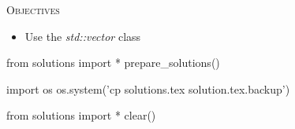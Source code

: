 
\textsc{Objectives}

\begin{itemize}
\item
  Use the \emph{std::vector} class
\end{itemize}





\begin{python0}
from solutions import *
prepare_solutions()
\end{python0}
\begin{python}
import os
os.system('cp solutions.tex solution.tex.backup')  
\end{python}

\begin{python0}
from solutions import *
clear()
\end{python0}
